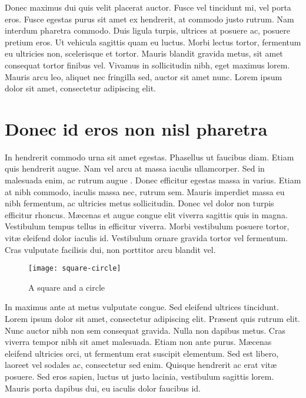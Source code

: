 Donec maximus dui quis velit placerat auctor. Fusce vel tincidunt mi, vel porta eros. Fusce egestas purus sit amet ex hendrerit, at commodo justo rutrum. Nam interdum pharetra commodo. Duis ligula turpis, ultrices at posuere ac, posuere pretium eros. Ut vehicula sagittis quam eu luctus. Morbi lectus tortor, fermentum eu ultricies non, scelerisque et tortor. Mauris blandit gravida metus, sit amet consequat tortor finibus vel. Vivamus in sollicitudin nibh, eget maximus lorem. Mauris arcu leo, aliquet nec fringilla sed, auctor sit amet nunc. Lorem ipsum dolor sit amet, consectetur adipiscing elit. 


\section{Donec id eros non nisl pharetra} %

In hendrerit commodo urna sit amet egestas. Phasellus ut faucibus diam. Etiam quis hendrerit augue. Nam vel arcu at massa iaculis ullamcorper. Sed in malesuada enim, ac rutrum augue \cite{Lenat83a}. Donec efficitur egestas massa in varius. Etiam at nibh commodo, iaculis massa nec, rutrum sem. Mauris imperdiet massa eu nibh fermentum, ac ultricies metus sollicitudin. Donec vel dolor non turpis efficitur rhoncus. M\ae{}cenas et augue congue elit viverra sagittis quis in magna. Vestibulum tempus tellus in efficitur viverra. Morbi vestibulum posuere tortor, vit\ae{} eleifend dolor iaculis id. Vestibulum ornare gravida tortor vel fermentum. Cras vulputate facilisis dui, non porttitor arcu blandit vel.

\begin{figure}
  \centering
  \texttt{[image: square-circle]}
  \caption{A square and a circle}
  \label{fig:square-circle}
\end{figure}

In maximus ante at metus vulputate congue. Sed eleifend ultrices tincidunt. Lorem ipsum dolor sit amet, consectetur adipiscing elit. Pr\ae{}sent quis rutrum elit. Nunc auctor nibh non sem consequat gravida. Nulla non dapibus metus. Cras viverra tempor nibh sit amet malesuada. Etiam non ante purus. M\ae{}cenas eleifend ultricies orci, ut fermentum erat suscipit elementum. Sed est libero, laoreet vel sodales ac, consectetur sed enim. Quisque hendrerit ac erat vit\ae{} posuere. Sed eros sapien, luctus ut justo lacinia, vestibulum sagittis lorem. Mauris porta dapibus dui, eu iaculis dolor faucibus id. 


%
%
%
%
%
%

%
%
%



